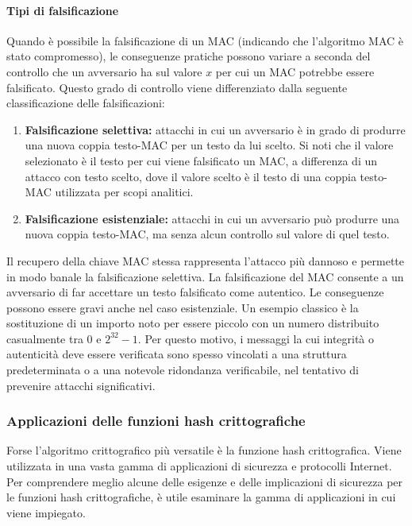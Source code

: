 \documentclass{article}
\theoremstyle{definition}
\begin{document}
\paragraph{Tipi di falsificazione}
Quando è possibile la falsificazione di un MAC (indicando che l'algoritmo MAC è stato compromesso), le conseguenze pratiche possono variare a seconda del controllo che un avversario ha sul valore \(x\) per cui un MAC potrebbe essere falsificato. Questo grado di controllo viene differenziato dalla seguente classificazione delle falsificazioni:

\begin{enumerate}
    \item \textbf{Falsificazione selettiva:} attacchi in cui un avversario è in grado di produrre una nuova coppia testo-MAC per un testo da lui scelto. Si noti che il valore selezionato è il testo per cui viene falsificato un MAC, a differenza di un attacco con testo scelto, dove il valore scelto è il testo di una coppia testo-MAC utilizzata per scopi analitici.
    \item \textbf{Falsificazione esistenziale:} attacchi in cui un avversario può produrre una nuova coppia testo-MAC, ma senza alcun controllo sul valore di quel testo.
\end{enumerate}

Il recupero della chiave MAC stessa rappresenta l'attacco più dannoso e permette in modo banale la falsificazione selettiva. La falsificazione del MAC consente a un avversario di far accettare un testo falsificato come autentico. Le conseguenze possono essere gravi anche nel caso esistenziale. Un esempio classico è la sostituzione di un importo noto per essere piccolo con un numero distribuito casualmente tra 0 e \(2^{32} - 1\). Per questo motivo, i messaggi la cui integrità o autenticità deve essere verificata sono spesso vincolati a una struttura predeterminata o a una notevole ridondanza verificabile, nel tentativo di prevenire attacchi significativi.
\subsubsection{Applicazioni delle funzioni hash crittografiche}
Forse l'algoritmo crittografico più versatile è la funzione hash crittografica. Viene utilizzata in una vasta gamma di applicazioni di sicurezza e protocolli Internet.
Per comprendere meglio alcune delle esigenze e delle implicazioni di sicurezza per le funzioni hash crittografiche, è utile esaminare la gamma di applicazioni in cui viene impiegato.
\end{document}
